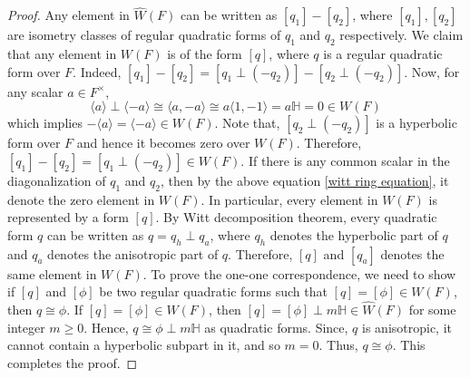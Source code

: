 \documentclass[10pt,a4paper]{amsart}
\begin{document}
\begin{proof}
    Any element in $\widehat W(F)$ can be written as $[q_1]-[q_2]$, where $[q_1], [q_2]$ are isometry classes of regular quadratic forms of $q_1$ and $q_2$ respectively. We claim that any element in $W(F)$ is of the form $[q]$, where $q$ is a regular quadratic form over $F$. Indeed, $[q_1]-[q_2]= [q_1 \perp (-q_2)]-[q_2 \perp (-q_2)]$. Now, for any scalar $a \in F^\times$, 
    \begin{equation} \label{witt ring equation}
          \langle a \rangle \perp \langle -a \rangle \cong \langle a, -a \rangle \cong a \langle 1,-1 \rangle = a \mathbb H = 0 \in W(F)
    \end{equation}
    which implies $- \langle a \rangle= \langle -a \rangle \in W(F)$. Note that, $[q_2 \perp (-q_2)]$ is a hyperbolic form over $F$ and hence it becomes zero over $W(F)$. Therefore, $[q_1]-[q_2]= [q_1 \perp (-q_2)] \in W(F)$. If there is any common scalar in the diagonalization of $q_1$ and $q_2$, then by the above equation \ref{witt ring equation}, it denote the zero element in $W(F)$. In particular, every element in $W(F)$ is represented by a form $[q]$. By Witt decomposition theorem, every quadratic form $q$ can be written as $q=q_h \perp q_a$, where $q_h$ denotes the hyperbolic part of $q$ and $q_a$ denotes the anisotropic part of $q$. Therefore, $[q]$ and $[q_a]$ denotes the same element in $W(F)$. To prove the one-one correspondence, we need to show if $[q]$ and $[\phi]$ be two regular quadratic forms such that $[q]= [\phi ] \in W(F)$, then $q \cong \phi$. If $[q]= [\phi ] \in W(F)$, then $[q]= [\phi] \perp m \mathbb H \in \widehat W(F)$ for some integer $m \geq 0$. Hence, $q \cong \phi \perp m \mathbb H$ as quadratic forms. Since, $q$ is anisotropic, it cannot contain a hyperbolic subpart in it, and so $m=0$. Thus, $q \cong \phi$. This completes the proof.
\end{proof}
\end{document}
